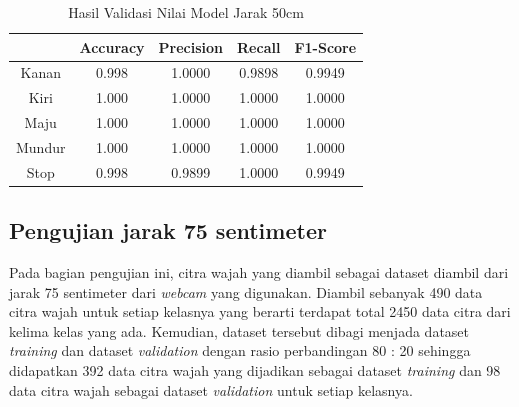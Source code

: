 \begin{table}[H]
  \centering
  \caption{Hasil Validasi Nilai Model Jarak 50cm}
  \label{tb:Hasil Validasi Nilai Model Jarak 50cm}
  \begin{tabular}{|c|c|c|c|c|}
    \hline
    \rowcolor[HTML]{C0C0C0} 
    \cellcolor[HTML]{C0C0C0} & Accuracy & Precision & Recall & F1-Score \\ \hline
    Kanan                    & 0.998    & 1.0000    & 0.9898 & 0.9949   \\ \hline
    Kiri                     & 1.000    & 1.0000    & 1.0000 & 1.0000   \\ \hline
    Maju                     & 1.000    & 1.0000    & 1.0000 & 1.0000   \\ \hline
    Mundur                   & 1.000    & 1.0000    & 1.0000 & 1.0000   \\ \hline
    Stop                     & 0.998    & 0.9899    & 1.0000 & 0.9949   \\ \hline
    \end{tabular}
    \end{table}

\subsection{Pengujian jarak 75 sentimeter}
Pada bagian pengujian ini, citra wajah yang diambil sebagai dataset diambil dari jarak 75 sentimeter dari \emph{webcam} yang digunakan. Diambil sebanyak 490 data citra wajah untuk setiap kelasnya yang berarti terdapat total 2450 data citra dari kelima kelas yang ada. Kemudian, dataset tersebut dibagi menjada dataset \emph{training} dan dataset \emph{validation} dengan rasio perbandingan 80 : 20 sehingga didapatkan 392 data citra wajah yang dijadikan sebagai dataset \emph{training} dan 98 data citra wajah sebagai dataset \emph{validation} untuk setiap kelasnya.

